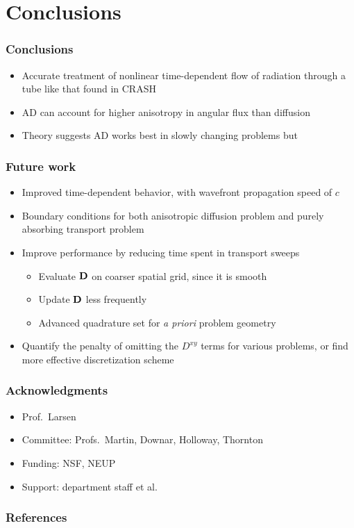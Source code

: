 \documentclass{beamer}
\newcommand{\Dtens}{\mat{D}}
\begin{document}
\section{Conclusions}
\begin{frame}
  \frametitle{Conclusions}
  \begin{itemize}
    \item Accurate treatment of nonlinear time-dependent flow of radiation
      through a tube like that found in CRASH
    \item AD can account for higher anisotropy in angular flux than diffusion
    \item Theory suggests AD works best in slowly changing problems but 
  \end{itemize}
\end{frame}
\begin{frame}
  \frametitle{Future work}
  \begin{itemize}
    \item Improved time-dependent behavior, with wavefront propagation speed of
      $c$
    \item Boundary conditions for both anisotropic diffusion problem and
      purely absorbing transport problem
    \item Improve performance by reducing time spent in transport sweeps
      \begin{itemize}
        \item Evaluate $\Dtens$ on coarser spatial grid, since it is smooth
        \item Update $\Dtens$ less frequently
        \item Advanced quadrature set for \emph{a priori} problem geometry
      \end{itemize}
    \item Quantify the penalty of omitting the $D^{xy}$ terms for various
      problems, or find more effective discretization scheme
  \end{itemize}
\end{frame}
\appendix
\begin{frame}
  \frametitle{Acknowledgments}
  \begin{itemize}
    \item Prof.~Larsen
    \item Committee: Profs.~Martin, Downar, Holloway, Thornton
    \item Funding: NSF, NEUP
    \item Support: department staff et al.
  \end{itemize}
\end{frame}
\begin{frame}
  \frametitle{References}


\end{frame}
\end{document}
